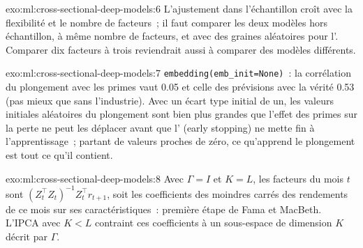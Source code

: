 \begin{solution}{exo:ml:cross-sectional-deep-models:6}
L'ajustement dans l'échantillon croît avec la flexibilité et le nombre de facteurs~; il faut comparer les deux modèles hors échantillon, à même nombre
de facteurs, et avec des graines aléatoires pour l'. Comparer dix facteurs à trois reviendrait aussi à comparer des modèles différents.
\end{solution}

\begin{solution}{exo:ml:cross-sectional-deep-models:7}
\texttt{embedding(emb\_init=None)}~: la corrélation du plongement avec les primes vaut 0.05 et celle des prévisions avec
la vérité 0.53 (pas mieux que sans l'industrie). Avec un écart type initial de un, les valeurs initiales aléatoires du
plongement sont bien plus grandes que l'effet des primes sur la perte ne peut les déplacer avant que l' (early stopping) ne mette fin à l'apprentissage~; partant
de valeurs proches de zéro, ce qu'apprend le plongement est tout ce qu'il contient.
\end{solution}

\begin{solution}{exo:ml:cross-sectional-deep-models:8}
Avec $\Gamma = I$ et $K = L$, les facteurs du mois $t$ sont $(Z_t^\top Z_t)^{-1}Z_t^\top r_{t+1}$, soit les coefficients des moindres carrés
des rendements de ce mois sur ses caractéristiques~: première étape de Fama et MacBeth. L'IPCA avec $K < L$ contraint
ces coefficients à un sous-espace de dimension $K$ décrit par $\Gamma$.
\end{solution}

